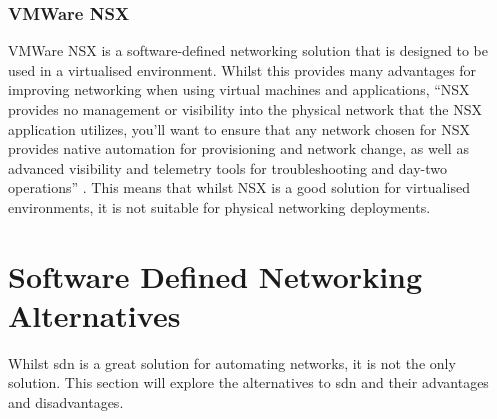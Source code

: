 \subsubsection{VMWare NSX}
VMWare NSX is a software-defined networking solution that is designed to be used in a virtualised environment. Whilst this provides many advantages for improving networking when using virtual machines and applications, ``NSX provides no management or visibility into the physical network that the NSX application utilizes, you'll want to ensure that any network chosen for NSX provides native automation for provisioning and network change, as well as advanced visibility and telemetry tools for troubleshooting and day-two operations'' \citep{2}. This means that whilst NSX is a good solution for virtualised environments, it is not suitable for physical networking deployments.

\section{Software Defined Networking Alternatives}
\label{litreview:alternatives}
Whilst \gls{sdn} is a great solution for automating networks, it is not the only solution. This section will explore the alternatives to \gls{sdn} and their advantages and disadvantages.